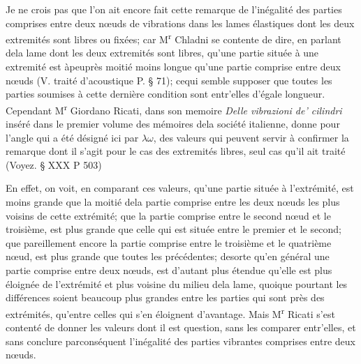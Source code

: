 \documentclass[11pt,a4paper]{article}
\begin{document}
Je ne crois pas que l'on ait encore fait cette remarque de l'inégalité des parties
comprises entre deux nœuds de vibrations dans les lames élastiques dont les deux extremités
sont libres ou fixées; car M\textsuperscript{r} Chladni se contente de dire, en parlant dela lame
dont les deux extremités sont libres, qu'une partie située à une extremité est
àpeuprès moitié moins longue qu'une partie comprise entre deux nœuds (V. traité d'acoustique
P.  § 71); cequi semble supposer que toutes les parties soumises à cette dernière
condition sont entr'elles d'égale longueur. Cependant M\textsuperscript{r} Giordano Ricati, dans
son memoire \emph{Delle vibrazioni de' cilindri} inséré dans le premier
volume des mémoires dela société italienne, donne pour l'angle qui a été
désigné ici par $\lambda\omega$, des valeurs qui peuvent servir à confirmer la remarque
dont il s'agit pour le cas des extremités libres, seul cas qu'il ait traité
(Voyez. § XXX P 503)


En effet, on voit, en comparant ces valeurs, qu'une partie située à l'extrémité, est
moins grande que la moitié dela partie comprise entre les deux nœuds les plus
voisins de cette extrémité; que la partie comprise entre le second nœud et le
troisième, est plus grande que celle qui est située entre le premier et le second;
que pareillement encore la partie comprise entre  le troisième et le
quatrième nœud, est plus grande que toutes les précédentes; desorte qu'en général
une partie comprise entre deux nœuds, est d'autant plus étendue qu'elle est
plus éloignée de l'extrémité et plus voisine du milieu dela lame, quoique
pourtant les différences soient beaucoup plus grandes entre les parties qui
sont près des extrémités, qu'entre celles qui s'en éloignent d'avantage.
Mais M\textsuperscript{r} Ricati s'est contenté de donner les valeurs dont il est question,
sans les comparer entr'elles, et sans conclure parconséquent l'inégalité des
parties vibrantes comprises entre deux nœuds.
\end{document}
